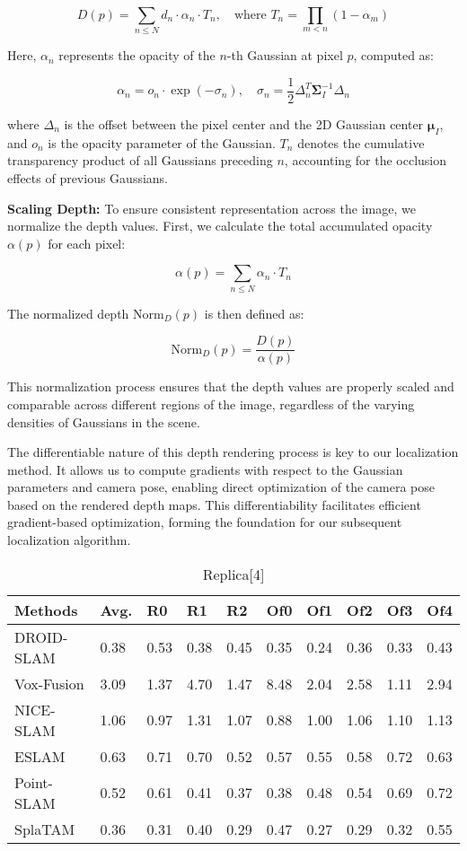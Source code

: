 \documentclass[twocolumn]{article} %
\begin{document}
\[D(p) = \sum_{n \leq N} d_n \cdot \alpha_n \cdot T_n, \quad \text{where } T_n = \prod_{m<n} (1 - \alpha_m)\]

Here, \(\alpha_n\) represents the opacity of the \(n\)-th Gaussian at
pixel \(p\), computed as:

\[\alpha_n = o_n \cdot \exp(-\sigma_n), \quad \sigma_n = \frac{1}{2} \Delta_n^T \boldsymbol{\Sigma}_I^{-1} \Delta_n\]

where \(\Delta_n\) is the offset between the pixel center and the 2D
Gaussian center \(\boldsymbol{\mu}_I\), and \(o_n\) is the opacity
parameter of the Gaussian. \(T_n\) denotes the cumulative transparency
product of all Gaussians preceding \(n\), accounting for the occlusion
effects of previous Gaussians.

\textbf{Scaling Depth:} To ensure consistent representation across the
image, we normalize the depth values. First, we calculate the total
accumulated opacity \(\alpha(p)\) for each pixel:

\[\alpha(p) = \sum_{n \leq N} \alpha_n \cdot T_n\]

The normalized depth \(\text{Norm}_D(p)\) is then defined as:

\[\text{Norm}_D(p) = \frac{D(p)}{\alpha(p)}\]

This normalization process ensures that the depth values are properly
scaled and comparable across different regions of the image, regardless
of the varying densities of Gaussians in the scene.

The differentiable nature of this depth rendering process is key to our
localization method. It allows us to compute gradients with respect to
the Gaussian parameters and camera pose, enabling direct optimization of
the camera pose based on the rendered depth maps. This differentiability
facilitates efficient gradient-based optimization, forming the
foundation for our subsequent localization algorithm.

\begin{table*}[b]
\centering
\begin{tabular}{llllllllll}
\hline
Methods & Avg. & R0 & R1 & R2 & Of0 & Of1 & Of2 & Of3 & Of4\\
\hline
DROID-SLAM & 0.38 & 0.53 & 0.38 & 0.45 & 0.35 & 0.24 & 0.36 & 0.33 & 0.43\\
Vox-Fusion & 3.09 & 1.37 & 4.70 & 1.47 & 8.48 & 2.04 & 2.58 & 1.11 & 2.94\\
NICE-SLAM & 1.06 & 0.97 & 1.31 & 1.07 & 0.88 & 1.00 & 1.06 & 1.10 & 1.13\\
ESLAM & 0.63 & 0.71 & 0.70 & 0.52 & 0.57 & 0.55 & 0.58 & 0.72 & 0.63\\
Point-SLAM & 0.52 & 0.61 & 0.41 & 0.37 & 0.38 & 0.48 & 0.54 & 0.69 & 0.72\\
SplaTAM & 0.36 & 0.31 & 0.40 & 0.29 & 0.47 & 0.27 & 0.29 & 0.32 & 0.55\\
\hline
\end{tabular}
\caption{Replica[4]}
\label{Table:}
\end{table*}
\end{document}
